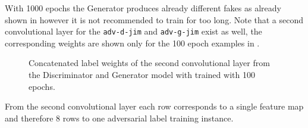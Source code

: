 With 1000 epochs the Generator produces already different fakes as already shown in  however it is not recommended to train for too long.
Note that a second convolutional layer for the \texttt{adv-d-jim} and \texttt{adv-g-jim} exist as well, the corresponding weights are shown only for the 100 epoch examples in .
\begin{figure}[!ht]
  \centering
  \qquad \qquad
  \caption{Concatenated label weights of the second convolutional layer from the Discriminator and Generator model with trained with 100 epochs.}
  \label{fig:nn_adv_label_weights_conv1}
\end{figure}
\FloatBarrier
\noindent
From the second convolutional layer each row corresponds to a single feature map and therefore 8 rows to one adversarial label training instance.
